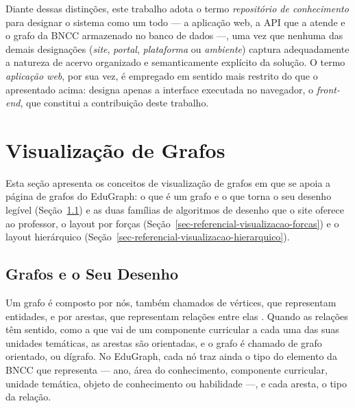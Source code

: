 Diante dessas distinções, este trabalho adota o termo \textit{repositório de conhecimento} para designar o sistema como um todo --- a aplicação web, a API que a atende e o grafo da BNCC armazenado no banco de dados ---, uma vez que nenhuma das demais designações (\textit{site}, \textit{portal}, \textit{plataforma} ou \textit{ambiente}) captura adequadamente a natureza de acervo organizado e semanticamente explícito da solução. O termo \textit{aplicação web}, por sua vez, é empregado em sentido mais restrito do que o apresentado acima: designa apenas a interface executada no navegador, o \textit{front-end}, que constitui a contribuição deste trabalho.


\section{Visualização de Grafos}
\label{sec-referencial-visualizacao}

Esta seção apresenta os conceitos de visualização de grafos em que se apoia a página de grafos do EduGraph: o que é um grafo e o que torna o seu desenho legível (Seção~\ref{sec-referencial-visualizacao-desenho}) e as duas famílias de algoritmos de desenho que o site oferece ao professor, o layout por forças (Seção~\ref{sec-referencial-visualizacao-forcas}) e o layout hierárquico (Seção~\ref{sec-referencial-visualizacao-hierarquico}).


\subsection{Grafos e o Seu Desenho}
\label{sec-referencial-visualizacao-desenho}

Um grafo é composto por nós, também chamados de vértices, que representam entidades, e por arestas, que representam relações entre elas \cite{healy2013hierarquico}. Quando as relações têm sentido, como a que vai de um componente curricular a cada uma das suas unidades temáticas, as arestas são orientadas, e o grafo é chamado de grafo orientado, ou dígrafo. No EduGraph, cada nó traz ainda o tipo do elemento da BNCC que representa --- ano, área do conhecimento, componente curricular, unidade temática, objeto de conhecimento ou habilidade ---, e cada aresta, o tipo da relação.

